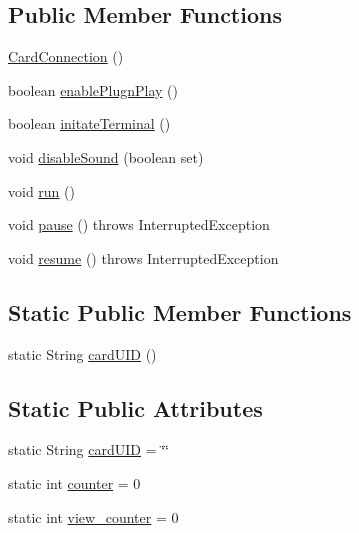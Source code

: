 \subsection*{Public Member Functions}
\begin{DoxyCompactItemize}
\item 
\mbox{\hyperlink{classams_1_1_card_connection_afa765cc7c8f61cb08327119713d328f9}{Card\+Connection}} ()
\item 
boolean \mbox{\hyperlink{classams_1_1_card_connection_a84c6991f3340668fe44a3b7122719bb7}{enable\+Plugn\+Play}} ()
\item 
boolean \mbox{\hyperlink{classams_1_1_card_connection_a29c57f229be609d06518d8764bcee323}{initate\+Terminal}} ()
\item 
void \mbox{\hyperlink{classams_1_1_card_connection_a9e20e93963b78e6b960dfdd5166504bb}{disable\+Sound}} (boolean set)
\item 
void \mbox{\hyperlink{classams_1_1_card_connection_a051dbf503815b5296b95ead953c5a137}{run}} ()
\item 
void \mbox{\hyperlink{classams_1_1_card_connection_ad64ef421bc44c06dc3ed799f281182ae}{pause}} ()  throws Interrupted\+Exception     
\item 
void \mbox{\hyperlink{classams_1_1_card_connection_abbba44c123cd6f69c54e7d9ea0e5e291}{resume}} ()  throws Interrupted\+Exception     
\end{DoxyCompactItemize}
\subsection*{Static Public Member Functions}
\begin{DoxyCompactItemize}
\item 
static String \mbox{\hyperlink{classams_1_1_card_connection_a25b0ff4c7b137be761f2814ef1dcaba7}{card\+U\+ID}} ()
\end{DoxyCompactItemize}
\subsection*{Static Public Attributes}
\begin{DoxyCompactItemize}
\item 
static String \mbox{\hyperlink{classams_1_1_card_connection_a50141d033d85f1e5859c09b4cdcf6d9f}{card\+U\+ID}} = \char`\"{}\char`\"{}
\item 
static int \mbox{\hyperlink{classams_1_1_card_connection_a4e2e084c8d7f8b0c4008f1f4b3723c5a}{counter}} = 0
\item 
static int \mbox{\hyperlink{classams_1_1_card_connection_a608f1d4516c799989ec105c6b72a83f1}{view\+\_\+counter}} = 0
\end{DoxyCompactItemize}


